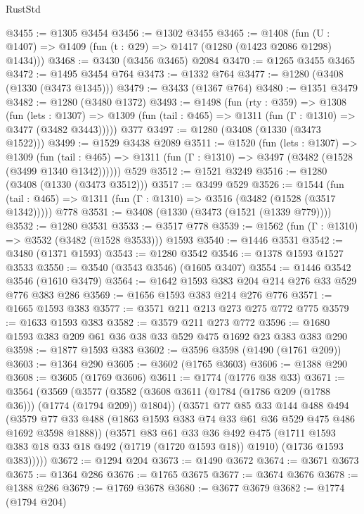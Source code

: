 \begin{lexlean}{RustStd}
\begin{coremodule}
@3455 := @1305 @3454
@3456 := @1302 @3455
@3465 := @1408 (fun (U : @1407) => @1409 (fun (t : @29) => @1417 (@1280 (@1423 @2086 @1298) @1434)))
@3468 := @3430 (@3456 @3465) @2084
@3470 := @1265 @3455 @3465
@3472 := @1495 @3454 @764
@3473 := @1332 @764
@3477 := @1280 (@3408 (@1330 (@3473 @1345)))
@3479 := @3433 (@1367 @764)
@3480 := @1351 @3479
@3482 := @1280 (@3480 @1372)
@3493 := @1498
    (fun (rty : @359) =>
    @1308
      (fun (lets : @1307) =>
      @1309 (fun (tail : @465) => @1311 (fun (Γ : @1310) => @3477 (@3482 @3443)))))
    @377
@3497 := @1280 (@3408 (@1330 (@3473 @1522)))
@3499 := @1529 @3438 @2089
@3511 := @1520
    (fun (lets : @1307) =>
    @1309
      (fun (tail : @465) => @1311 (fun (Γ : @1310) => @3497 (@3482 (@1528 (@3499 @1340 @1342))))))
    @529
@3512 := @1521 @3249
@3516 := @1280 (@3408 (@1330 (@3473 @3512)))
@3517 := @3499 @529
@3526 := @1544
    (fun (tail : @465) => @1311 (fun (Γ : @1310) => @3516 (@3482 (@1528 (@3517 @1342)))))
    @778
@3531 := @3408 (@1330 (@3473 (@1521 (@1339 @779))))
@3532 := @1280 @3531
@3533 := @3517 @778
@3539 := @1562 (fun (Γ : @1310) => @3532 (@3482 (@1528 @3533))) @1593
@3540 := @1446 @3531
@3542 := @3480 (@1371 @1593)
@3543 := @1280 @3542
@3546 := @1378 @1593 @1527 @3533
@3550 := @3540 (@3543 @3546) (@1605 @3407)
@3554 := @1446 @3542 @3546 (@1610 @3479)
@3564 := @1642 @1593 @383 @204 @214 @276 @33 @529 @776 @383 @286
@3569 := @1656 @1593 @383 @214 @276 @776
@3571 := @1665 @1593 @383
@3577 := @3571 @211 @213 @273 @275 @772 @775
@3579 := @1633 @1593 @383
@3582 := @3579 @211 @273 @772
@3596 := @1680 @1593 @383 @209 @61 @36 @38 @33 @529 @475 @1692 @23 @383 @383 @290
@3598 := @1877 @1593 @383
@3602 := @3596 @3598 (@1490 (@1761 @209))
@3603 := @1364 @290
@3605 := @3602 (@1765 @3603)
@3606 := @1388 @290
@3608 := @3605 (@1769 @3606)
@3611 := @1774 (@1776 @38 @33)
@3671 := @3564
    (@3569
      (@3577
        (@3582 (@3608 @3611 (@1784 (@1786 @209 (@1788 @36))) (@1774 (@1794 @209)) @1804))
        (@3571
          @77
          @85
          @33
          @144
          @488
          @494
          (@3579 @77 @33 @488 (@1863 @1593 @383 @74 @33 @61 @36 @529 @475 @486 @1692 @3598 @1888))
          (@3571
            @83
            @61
            @33
            @36
            @492
            @475
            (@1711 @1593 @383 @18 @33 @18 @492 (@1719 (@1720 @1593 @18)) @1910)
            (@1736 @1593 @383)))))
@3672 := @1294 @204
@3673 := @1490 @3672
@3674 := @3671 @3673
@3675 := @1364 @286
@3676 := @1765 @3675
@3677 := @3674 @3676
@3678 := @1388 @286
@3679 := @1769 @3678
@3680 := @3677 @3679
@3682 := @1774 (@1794 @204)

\end{coremodule}
\end{lexlean}
